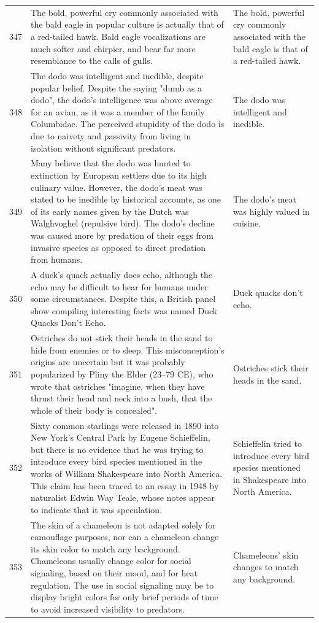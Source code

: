 \begin{tabular}{c|p{}|p{}}
347 & The bold, powerful cry commonly associated with the bald eagle in popular culture is actually that of a red-tailed hawk. Bald eagle vocalizations are much softer and chirpier, and bear far more resemblance to the calls of gulls. & The bold, powerful cry commonly associated with the bald eagle is that of a red-tailed hawk. \\
348 & The dodo was intelligent and inedible, despite popular belief. Despite the saying "dumb as a dodo", the dodo's intelligence was above average for an avian, as it was a member of the family Columbidae. The perceived stupidity of the dodo is due to naivety and passivity from living in isolation without significant predators. & The dodo was intelligent and inedible. \\
349 & Many believe that the dodo was hunted to extinction by European settlers due to its high culinary value. However, the dodo's meat was stated to be inedible by historical accounts, as one of its early names given by the Dutch was Walghvoghel (repulsive bird). The dodo's decline was caused more by predation of their eggs from invasive species as opposed to direct predation from humans. & The dodo's meat was highly valued in cuisine. \\
350 & A duck's quack actually does echo, although the echo may be difficult to hear for humans under some circumstances. Despite this, a British panel show compiling interesting facts was named Duck Quacks Don't Echo. & Duck quacks don't echo. \\
351 & Ostriches do not stick their heads in the sand to hide from enemies or to sleep. This misconception's origins are uncertain but it was probably popularized by Pliny the Elder (23–79 CE), who wrote that ostriches "imagine, when they have thrust their head and neck into a bush, that the whole of their body is concealed". & Ostriches stick their heads in the sand. \\
352 & Sixty common starlings were released in 1890 into New York's Central Park by Eugene Schieffelin, but there is no evidence that he was trying to introduce every bird species mentioned in the works of William Shakespeare into North America. This claim has been traced to an essay in 1948 by naturalist Edwin Way Teale, whose notes appear to indicate that it was speculation. & Schieffelin tried to introduce every bird species mentioned in Shakespeare into North America. \\
353 & The skin of a chameleon is not adapted solely for camouflage purposes, nor can a chameleon change its skin color to match any background. Chameleons usually change color for social signaling, based on their mood, and for heat regulation. The use in social signaling may be to display bright colors for only brief periods of time to avoid increased visibility to predators. & Chameleons' skin changes to match any background. \\

\end{tabular}
